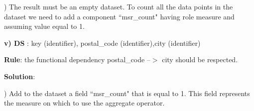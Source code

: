 ) The result must be an empty dataset. To count all the data points in the dataset we need to add a component ``msr\_count" having role measure and assuming value equal to 1.

\begin{table}
\begin{center}
\footnotesize
{}
\caption{Translation of example iv)}
\centering
\label{Tab1-5}
\end{center}
\end{table}

\bigskip\noindent
\textbf{v) DS} : key (identifier), postal\_code (identifier),city (identifier) 

\bigskip\noindent
\textbf{Rule}: the functional dependency  postal\_code --$>$ city  should be respected. 

\bigskip\noindent
\textbf{Solution}:

) Add to the dataset a field ``msr\_count" that is equal to 1. This field represents the measure on which to use the aggregate operator.

